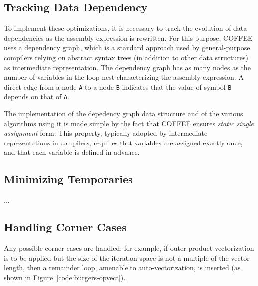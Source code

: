 \subsection{Tracking Data Dependency}
To implement these optimizations, it is necessary to track the evolution of data dependencies as the assembly expression is rewritten. For this purpose, COFFEE uses a dependency graph, which is a standard approach used by general-purpose compilers relying on abstract syntax trees (in addition to other data structures) as intermediate representation. The dependency graph has as many nodes as the number of variables in the loop nest characterizing the assembly expression. A direct edge from a node \texttt{A} to a node \texttt{B} indicates that the value of symbol \texttt{B} depends on that of \texttt{A}. 

The implementation of the depedency graph data structure and of the various algorithms using it is made simple by the fact that COFFEE ensures \textit{static single assignment} form. This property, typically adopted by intermediate representations in compilers, requires that variables are assigned exactly once, and that each variable is defined in advance. 

\subsection{Minimizing Temporaries}
...

\subsection{Handling Corner Cases}
Any possible corner cases are handled: for example, if outer-product vectorization is to be applied but the size of the iteration space is not a multiple of the vector length, then a remainder loop, amenable to auto-vectorization, is inserted (as shown in Figure~\ref{code:burgers-opvect}).